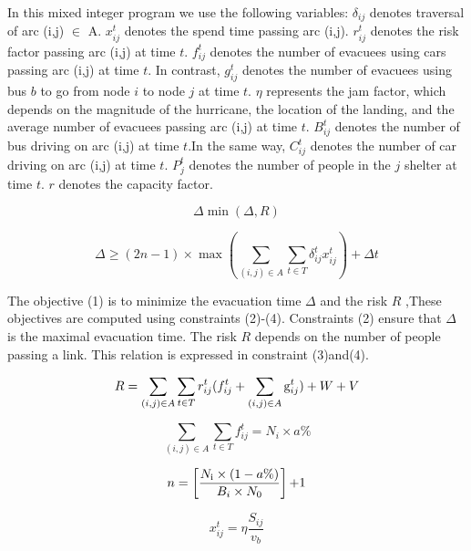 \documentclass{mcmthesis}
\begin{document}
In this mixed integer program we use the following variables: $\delta _{ij}$ denotes traversal of arc (i,j) $ \in $ A. $x_{ij}^t$ denotes the spend time passing arc (i,j). $r_{ij}^t$ denotes the risk factor passing arc (i,j) at time $t$. $f_{ij}^t$ denotes the number of evacuees using cars passing arc (i,j) at time $t$. In contrast, $g_{ij}^t$ denotes the number of evacuees using bus $b$ to go from node $i$ to node $j$ at time $t$. $\eta $ represents the jam factor, which depends on the magnitude of the hurricane, the location of the landing, and the average number of evacuees passing arc (i,j) at time $t$. $B_{ij}^t$ denotes the number of bus driving on arc (i,j) at time $t$.In the same way, $C_{ij}^t$ denotes the number of car driving on arc (i,j) at time $t$. $P_j^t$  denotes the number of people in the $j$ shelter at time $t$. $r$ denotes the capacity factor.


\begin{equation}\label{3}
  \Delta \min (\Delta ,R)
\end{equation}

\begin{equation}\label{4}
  \Delta  \ge (2n - 1) \times \max (\sum\limits_{(i,j) \in A} {\sum\limits_{t \in T} {\delta _{ij}^tx_{ij}^t} } ) + \Delta t
\end{equation}

The objective (1) is to minimize the evacuation time $\Delta $ and the risk $R$ ,These objectives are computed using constraints (2)-(4). Constraints (2) ensure that $\Delta $ is the maximal evacuation time. The risk $R$ depends on the number of people passing a link. This relation is expressed in constraint (3)and(4).

\begin{equation}\label{5}
  R = \sum\limits_{(i,j) \in A} {\sum\limits_{t \in T} {r_{ij}^t} } (f_{ij}^t + \sum\limits_{(i,j) \in A} {{\rm{g}}_{ij}^t} ) + W + V
\end{equation}

\begin{equation}\label{6}
  \sum\limits_{(i,j) \in A} {\sum\limits_{t \in T} {f_{ij}^t} }  = {N_i} \times a\%
\end{equation}

\begin{equation}\label{7}
  n = \left[ {\frac{{{N_{\rm{i}}} \times (1 - a\% )}}{{{B_i} \times {N_0}}}} \right]{\rm{ + }}1
\end{equation}

\begin{equation}\label{8}
  x_{ij}^t = \eta \frac{{{S_{ij}}}}{{{v_b}}}
\end{equation}
\end{document}
